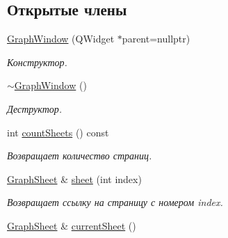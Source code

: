 \subsection*{Открытые члены}
\begin{DoxyCompactItemize}
\item 
\hyperlink{class_graph_window_a68f193cacc0237a41d8c44923b53c11a}{Graph\+Window} (Q\+Widget $\ast$parent=nullptr)\hypertarget{class_graph_window_a68f193cacc0237a41d8c44923b53c11a}{}\label{class_graph_window_a68f193cacc0237a41d8c44923b53c11a}

\begin{DoxyCompactList}\small\item\em Конструктор. \end{DoxyCompactList}\item 
\hyperlink{class_graph_window_acca1dc8c3eefe6608ae2de3cee2e22ee}{$\sim$\+Graph\+Window} ()\hypertarget{class_graph_window_acca1dc8c3eefe6608ae2de3cee2e22ee}{}\label{class_graph_window_acca1dc8c3eefe6608ae2de3cee2e22ee}

\begin{DoxyCompactList}\small\item\em Деструктор. \end{DoxyCompactList}\item 
int \hyperlink{class_graph_window_a5a433ecbf8a3b30292de59955c5fa4ff}{count\+Sheets} () const \hypertarget{class_graph_window_a5a433ecbf8a3b30292de59955c5fa4ff}{}\label{class_graph_window_a5a433ecbf8a3b30292de59955c5fa4ff}

\begin{DoxyCompactList}\small\item\em Возвращает количество страниц. \end{DoxyCompactList}\item 
\hyperlink{class_graph_sheet}{Graph\+Sheet} \& \hyperlink{class_graph_window_a756c68dacb48b03ac45d457d61a760d8}{sheet} (int index)\hypertarget{class_graph_window_a756c68dacb48b03ac45d457d61a760d8}{}\label{class_graph_window_a756c68dacb48b03ac45d457d61a760d8}

\begin{DoxyCompactList}\small\item\em Возвращает ссылку на страницу с номером index. \end{DoxyCompactList}\item 
\hyperlink{class_graph_sheet}{Graph\+Sheet} \& \hyperlink{class_graph_window_a1e2ba902888b95d5fef9dfe081bac90b}{current\+Sheet} ()\hypertarget{class_graph_window_a1e2ba902888b95d5fef9dfe081bac90b}{}\label{class_graph_window_a1e2ba902888b95d5fef9dfe081bac90b}


\end{DoxyCompactItemize}
